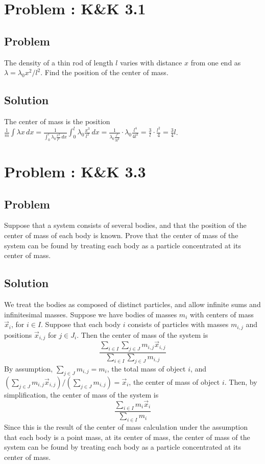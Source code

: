 \documentclass[solutions]{esg8012pset}
\date{October 1}
\renewcommand{\d}{\,d}
\begin{document}
\section{Problem \thesection: K\&K 3.1}
\subsection{Problem}
  The density of a thin rod of length $l$ varies with distance $x$ from one end as $\lambda = \lambda_0 x^2 / l^2$.  Find the position of the center of mass.
\subsection{Solution}
  The center of mass is the position $\displaystyle \frac{1}{m} \int \lambda x\d{x} = \frac{1}{\int_{0}^l \lambda_0 \frac{x^2}{l^2}\d{x}} \int_0^l \lambda_0 \frac{x^3}{l^2}\d{x} = \frac{1}{\lambda_0\frac{l^3}{3l^2}}\cdot\lambda_0\frac{l^4}{4l^2} = \frac{3}{l}\cdot \frac{l^2}{4} = \frac{3}{4}l$.
\section{Problem \thesection: K\&K 3.3}
\subsection{Problem}
  Suppose that a system consists of several bodies, and that the position of the center of mass of each body is known. Prove that the center of mass of the system can be found by treating each body as a particle concentrated at its center of mass.
\subsection{Solution}
  We treat the bodies as composed of distinct particles, and allow infinite sums and infinitesimal masses.  Suppose we have bodies of masses $m_i$ with centers of mass $\vec x_i$, for $i\in I$.  Suppose that each body $i$ consists of particles with masses $m_{i, j}$ and positions $\vec x_{i, j}$ for $j\in J_i$.  Then the center of mass of the system is
  $$\frac{\displaystyle \sum_{i\in I} \sum_{j\in J} m_{i, j}\vec x_{i, j}}{\displaystyle \sum_{i\in I} \sum_{j\in J} m_{i, j}}$$
  By assumption, $\sum_{j\in J} m_{i, j} = m_i$, the total mass of object $i$, and $\left(\sum_{j\in J} m_{i, j}\vec x_{i, j}\right) / \left(\sum_{j\in J} m_{i, j}\right) = \vec x_i$, the center of mass of object $i$.  Then, by simplification, the center of mass of the system is
  $$\frac{\displaystyle \sum_{i\in I} m_i \vec x_i}{\displaystyle \sum_{i\in I} m_i}$$
  Since this is the result of the center of mass calculation under the assumption that each body is a point mass, at its center of mass, the center of mass of the system can be found by treating each body as a particle concentrated at its center of mass.
\end{document}
